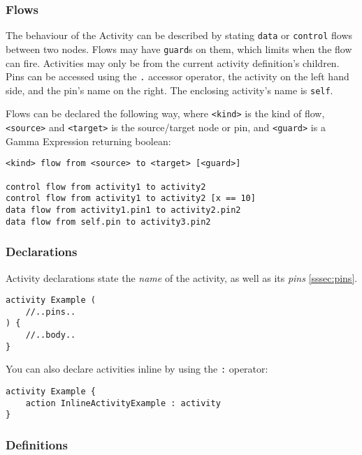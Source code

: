 \subsubsection*{Flows}\label{sssec:flows}

The behaviour of the Activity can be described by stating \verb|data| or \verb|control| flows between two nodes. Flows may have \verb|guard|s on them, which limits when the flow can fire. Activities may only be from the current activity definition's children. Pins can be accessed using the \verb|.| accessor operator, the activity on the left hand side, and the pin's name on the right. The enclosing activity's name is \verb|self|.

Flows can be declared the following way, where \verb|<kind>| is the kind of flow, \verb|<source>| and \verb|<target>| is the source/target node or pin, and \verb|<guard>| is a Gamma Expression returning boolean:

\begin{lstlisting}[language=activity]
<kind> flow from <source> to <target> [<guard>]

control flow from activity1 to activity2
control flow from activity1 to activity2 [x == 10]
data flow from activity1.pin1 to activity2.pin2
data flow from self.pin to activity3.pin2
\end{lstlisting}

\subsubsection*{Declarations}

Activity declarations state the \emph{name} of the activity, as well as its \emph{pins} \ref{sssec:pins}. 

\begin{lstlisting}[language=activity]
activity Example (
	//..pins..
) {
	//..body..
}
\end{lstlisting}

You can also declare activities inline by using the \verb|:| operator:

\begin{lstlisting}[language=activity]
activity Example {
	action InlineActivityExample : activity
}
\end{lstlisting}

\subsubsection*{Definitions}

